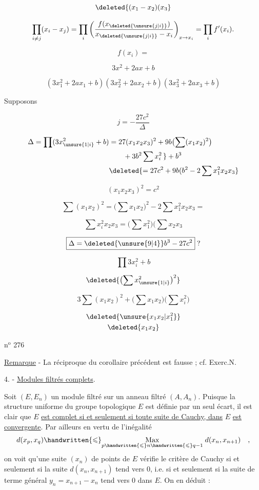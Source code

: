 \[
\deleted{(x_1-x_2)(x_3}
\]

\[
\prod_{i\ne j}(x_i-x_j)=\prod_i\left(\frac{f(x_{\deleted{\unsure{j|i}}})}{x_{\deleted{\unsure{j|i}}}-x_i}\right)_{x\to x_i}=\prod_i f'(x_i).
\]

\[
f(x_i)=
\]

\[
3x^2+2ax+b
\]

\[
(3x_1^2+2ax_1+b)(3x_2^2+2ax_2+b)(3x_3^2+2ax_3+b)
\]

Supposons  

\[
j=-\frac{27c^2}{\Delta}
\]

\[
\begin{aligned}
\Delta=\prod(3x_{\unsure{1|i}}^2+b)&=27(x_1x_2x_3)^2+9b\bigl(\sum(x_1x_2)^2\bigr)\\
&\qquad+3b^2\sum x_i^2\,\}+b^3\\
&\deleted{=27c^2+9b(b^2-2\sum x_1^2x_2x_3}
\end{aligned}
\]

\[
(x_1x_2x_3)^2=c^2
\]

\[
\sum(x_1x_2)^2=\bigl(\sum x_1x_2\bigr)^2-2\sum x_1^2x_2x_3=
\]

\[
\sum x_i^2x_2x_3=\bigl(\sum x_1^2\bigr)\bigl(\sum x_2x_3
\]

\[
\boxed{\Delta=\deleted{\unsure{9|4}}b^3-27c^2}\;?
\]

\[
\prod 3x_i^2+b
\]

\[
\deleted{\bigl(\sum x_{\unsure{1|i}}^2\bigr)^2}
\]

\[
3\sum(x_1x_2)^2+\bigl(\sum x_1x_2\bigr)\bigl(\sum x_i^2\bigr)
\]

\[
\begin{gathered}
\deleted{\unsure{x_1x_2|x_1^2}}\\
\deleted{x_1x_2}
\end{gathered}
\]

\hfill n$^{\mathrm{o}}$ 276

\uline{Remarque} - La réciproque du corollaire précédent est fausse ; cf. Exerc.N.

4. - \uline{Modules filtrés complets}.

Soit $(E,E_n)$ un module filtré sur un anneau filtré $(A,A_n)$. Puisque la structure uniforme du groupe topologique $E$ est définie par un seul écart, il est clair que $E$ \uline{est complet si et seulement si toute suite de Cauchy, dans} $E$ \uline{est convergente}. Par ailleurs en vertu de l'inégalité
\[
d(x_p,x_q)\handwritten{\leqslant}\underset{p\handwritten{\leqslant} n\handwritten{\leqslant} q-1}{\mathrm{Max}}\;d(x_n,x_{n+1})\quad,
\]
on voit qu'une suite $(x_n)$ de points de $E$ vérifie le critère de Cauchy si et seulement si la suite $d(x_n,x_{n+1})$ tend vers 0, i.e. si et seulement si la suite de terme général $y_n=x_{n+1}-x_n$ tend vers 0 dans $E$. On en déduit :

